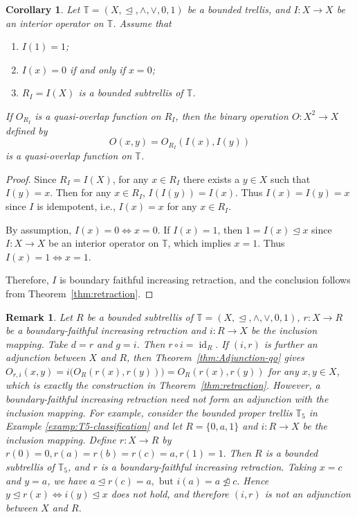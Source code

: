 \documentclass[preprint,12pt]{elsarticle}
\newtheorem{corollary}[theorem]{Corollary}
\newtheorem{remark}[theorem]{Remark}
\begin{document}
\begin{corollary}\label{cor:interior}
Let $\mathbb{T}=(X,\trianglelefteq,\wedge,\vee,0,1)$ be a bounded trellis, and $I:X\to X$ be an interior operator on $\mathbb{T}$.
Assume that
\begin{enumerate}[label=(\roman*)]
\item $I(1)=1$;
\item $I(x)=0$ if and only if $x=0$;
\item $R_I=I(X)$ is a bounded subtrellis of $\mathbb{T}$.
\end{enumerate}
If $O_{R_I}$ is a quasi-overlap function on $R_I$, then the binary
operation $O:X^2\to X$ defined by
$$
 O(x,y)=O_{R_I}(I(x),I(y))
$$
is a quasi-overlap function on $\mathbb{T}$.
\end{corollary}

\begin{proof}
Since $R_I=I(X)$, for any $x\in R_I$ there exists a $y\in X$ such that $I(y)=x$. Then for any $x\in R_I$, $I(I(y))=I(x)$. Thus $I(x)=I(y)=x$ since $I$ is idempotent, i.e., $I(x)=x$ for any $x\in R_I$.

By assumption,
$
 I(x)=0\Longleftrightarrow x=0.
$
If $I(x)=1$, then $
 1=I(x)\trianglelefteq x
$
since $I:X\to X$ be an interior operator on $\mathbb{T}$, which implies $x=1$. Thus
$
 I(x)=1\Longleftrightarrow x=1.
$

Therefore, $I$ is boundary faithful increasing retraction, and the conclusion follows from Theorem~\ref{thm:retraction}.
\end{proof}

\begin{remark}\label{rem:Adjunction-retraction}
\emph{Let $R$ be a bounded subtrellis of $\mathbb{T}=(X,\trianglelefteq,\wedge,\vee,0,1)$, $r:X\to R$ be a boundary-faithful increasing retraction and $i:R\to X$ be the inclusion mapping. Take $d=r$ and $g=i$.
Then
$r\circ i=\operatorname{id}_R.$
If $(i,r)$ is further an adjunction between $X$ and $R$, then
Theorem~\ref{thm:Adjunction-qo} gives
$
 O_{r,i}(x,y)
 =
 i\bigl(O_R(r(x),r(y))\bigr)
 =
 O_R(r(x),r(y))
$
for any $x,y\in X$, which is exactly the construction in
Theorem~\ref{thm:retraction}. However, a boundary-faithful increasing retraction need not form an adjunction with the inclusion mapping. For example, consider the bounded proper trellis $\mathbb{T}_5$ in Example \ref{examp:T5-classification} and let
$
R=\{0,a,1\}
$
and $i:R\to X$ be the inclusion mapping. Define $r: X\to R$ by
$
r(0)=0, r(a)=r(b)=r(c)=a, r(1)=1.
$
Then $R$ is a bounded subtrellis of $\mathbb{T}_5$, and $r$ is a
boundary-faithful increasing retraction.
Taking $x=c$ and $y=a$, we have
$
a\trianglelefteq r(c)=a,
\mbox{ but }
i(a)=a\ntrianglelefteq c.
$
Hence
$
y\trianglelefteq r(x)
\Longleftrightarrow
i(y)\trianglelefteq x
$
does not hold, and therefore $(i,r)$ is not an adjunction
between $X$ and $R$.}
\end{remark}
\end{document}
